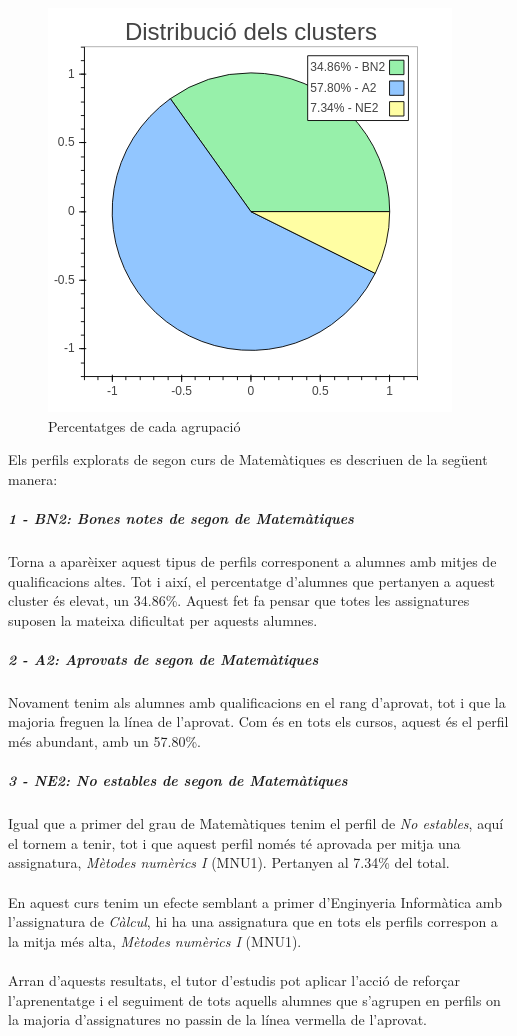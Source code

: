 \documentclass[12pt,a4paper,catalan]{article}
\begin{document}
\begin{figure}[h]
\centering
\includegraphics[width=.4\linewidth]{img/perfils_segon_mates_pastilla.png}
\caption{Percentatges de cada agrupació}
\label{fig:passegonmates}
\end{figure}

\newpage

Els perfils explorats de segon curs de Matemàtiques es descriuen de la següent manera:

\subparagraph{1 - BN2: Bones notes de segon de Matemàtiques}
Torna a aparèixer aquest tipus de perfils corresponent a alumnes amb mitjes de qualificacions altes. Tot i així, el percentatge d'alumnes que pertanyen a aquest cluster és elevat, un 34.86\%. Aquest fet fa pensar que totes les assignatures suposen la mateixa dificultat per aquests alumnes.

\subparagraph{2 - A2: Aprovats de segon de Matemàtiques}
Novament tenim als alumnes amb qualificacions en el rang d'aprovat, tot i que la majoria freguen la línea de l'aprovat. Com és en tots els cursos, aquest és el perfil més abundant, amb un 57.80\%.

\subparagraph{3 - NE2: No estables de segon de Matemàtiques}
Igual que a primer del grau de Matemàtiques tenim el perfil de \textit{No estables}, aquí el tornem a tenir, tot i que aquest perfil només té aprovada per mitja una assignatura, \textit{Mètodes numèrics I} (MNU1). Pertanyen al 7.34\% del total.
\\
\\
En aquest curs tenim un efecte semblant a primer d'Enginyeria Informàtica amb l'assignatura de \textit{Càlcul}, hi ha una assignatura que en tots els perfils correspon a la mitja més alta, \textit{Mètodes numèrics I} (MNU1).
\\
\\
Arran d'aquests resultats, el tutor d'estudis pot aplicar l'acció de reforçar l'aprenentatge i el seguiment de tots aquells alumnes que s'agrupen en perfils on la majoria d'assignatures no passin de la línea vermella de l'aprovat.
\end{document}
